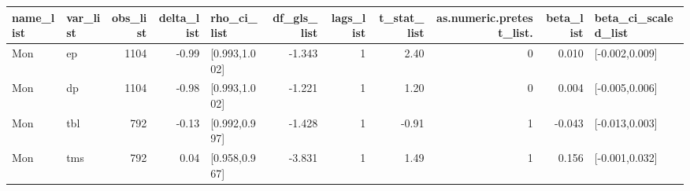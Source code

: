 \begin{table}[ht]
\centering
\begin{tabular}{llrrlrrrrrl}
  \hline
name\_list & var\_list & obs\_list & delta\_list & rho\_ci\_list & df\_gls\_list & lags\_list & t\_stat\_list & as.numeric.pretest\_list. & beta\_list & beta\_ci\_scaled\_list \\ 
  \hline
Mon & ep & 1104 & -0.99 & [0.993,1.002] & -1.343 & 1 & 2.40 & 0 & 0.010 & [-0.002,0.009] \\ 
  Mon & dp & 1104 & -0.98 & [0.993,1.002] & -1.221 & 1 & 1.20 & 0 & 0.004 & [-0.005,0.006] \\ 
  Mon & tbl & 792 & -0.13 & [0.992,0.997] & -1.428 & 1 & -0.91 & 1 & -0.043 & [-0.013,0.003] \\ 
  Mon & tms & 792 & 0.04 & [0.958,0.967] & -3.831 & 1 & 1.49 & 1 & 0.156 & [-0.001,0.032] \\ 
   \hline
\end{tabular}
\end{table}
